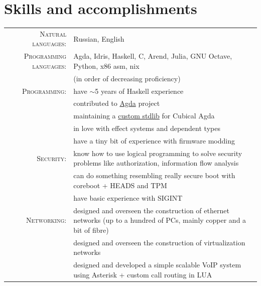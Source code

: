 \documentclass[a4paper,11pt]{article}
\begin{document}
  \section{Skills and accomplishments}
    \begin{longtable}{rp{}}
      \textsc{Natural languages:} & Russian, English \\

      \textsc{Programming languages:} & Agda, Idris, Haskell, C, Arend, Julia, GNU Octave, Python, x86 asm, nix  \\
                                      & (in order of decreasing proficiency)                                     \\

      \textsc{Programming:} & have $\sim$5 years of Haskell experience                                                      \\
                            & contributed to \href{https://github.com/agda/agda}{Agda} project                              \\
                            & maintaining a \href{https://github.com/cmcmA20/cubical-mini}{custom stdlib} for Cubical Agda  \\
                            & in love with effect systems and dependent types                                               \\
                            & have a tiny bit of experience with firmware modding                                           \\

      \textsc{Security:} & know how to use logical programming to solve security problems like authorization, information flow analysis  \\
                         & can do something resembling really secure boot with coreboot + HEADS and TPM                                  \\
                         & have basic experience with SIGINT                                                                             \\

      \textsc{Networking:} & designed and overseen the construction of ethernet
                             networks (up to a hundred of PCs, mainly copper and a bit of fibre)  \\
                           & designed and overseen the construction of virtualization
                             networks                                                             \\
                           & designed and developed a simple scalable VoIP system
                             using Asterisk + custom call routing in LUA                          \\


\end{longtable}
\end{document}

